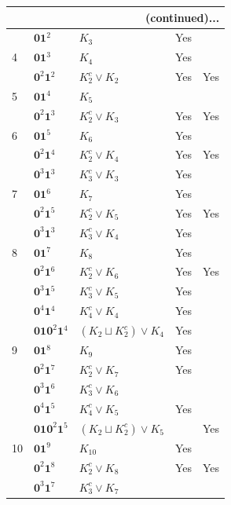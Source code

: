 \documentclass[preprint]{elsarticle}
\begin{document}
\begin{center}
\begin{longtable}{p{0.7cm} p{2cm} p{4cm} p{1cm} p{0cm}}
\hline \multicolumn{5}{r}{{(continued)...}} \\ \hline
\endfoot
\endlastfoot
3 & $\mathbf{0}\mathbf{1}^{2}$ & $K_{3}$ & Yes & \\
\hline
4 & $\mathbf{0}\mathbf{1}^{3}$ & $ K_{4}$ & Yes &  \\
  & $\mathbf{0}^{2}\mathbf{1}^{2}$ & $K_{2}^c \vee K_{2}$ &  Yes & Yes \\
\hline
5 &  $\mathbf{0}\mathbf{1}^{4}$ & $K_5$ &  & \\
  &  $\mathbf{0}^{2}\mathbf{1}^{3}$ & $ K_{2}^c \vee K_{3}$ &  Yes & Yes\\
  \hline
6 & $\mathbf{0}\mathbf{1}^{5}$ & $K_6$ &  Yes & \\
& $\mathbf{0}^{2}\mathbf{1}^{4}$ & $K_{2}^c \vee K_{4}$ &  Yes & Yes \\
& $\mathbf{0}^{3}\mathbf{1}^{3}$ & $K_{3}^c \vee K_{3}$ &  Yes & \\
\hline
7 & $\mathbf{0}\mathbf{1}^{6}$ & $ K_{7}$ &  Yes & \\
  & $\mathbf{0}^2\mathbf{1}^5$ & $K_{2}^c \vee K_{5}$  &  Yes & Yes\\
  & $\mathbf{0}^3\mathbf{1}^3$ & $K_{3}^c \vee K_{4}$ &  Yes &\\
  \hline
8 & $\mathbf{0}\mathbf{1}^7$ & $ K_{8}$ &  Yes& \\
&$\mathbf{0}^{2}\mathbf{1}^6$ & $ K_{2}^c \vee K_{6}$ &  Yes & Yes\\
&$\mathbf{0}^3\mathbf{1}^5$ & $ K_{3}^c \vee K_{5}$ &  Yes&\\
&$\mathbf{0}^4 \mathbf{1}^4$ & $ K_{4}^c \vee K_{4}$ &  Yes&\\
&$\mathbf{0}\mathbf{1}\mathbf{0}^2\mathbf{1}^4$ & $ (K_{2} \sqcup K_{2}^c) \vee K_{4}$ &  Yes& \\
\hline
9& $\mathbf{0}\mathbf{1}^8$ & $K_{9}$ &  Yes& \\
& $\mathbf{0}^2\mathbf{1}^7$ & $ K_{2}^c \vee K_{7}$ &  Yes& \\
& $\mathbf{0}^3\mathbf{1}^6$ & $ K_{3}^c \vee K_{6}$ & &\\
& $\mathbf{0}^4\mathbf{1}^5$ & $ K_{4}^c \vee K_{5}$ &  Yes&\\
& $\mathbf{0}\mathbf{1}\mathbf{0}^2\mathbf{1}^{5}$ & $(K_{2} \sqcup K_{2}^c )\vee K_{5}$ & & Yes \\
\hline
10&$\mathbf{0}\mathbf{1}^9$ & $ K_{10}$ & Yes& \\
&$\mathbf{0}^2 \mathbf{1}^8$ & $ K_{2}^c \vee K_{8}$ & Yes& Yes \\
&$\mathbf{0}^3 \mathbf{1}^7$ & $ K_{3}^c \vee K_{7}$ & &\\

\end{longtable}
\end{center}
\end{document}
